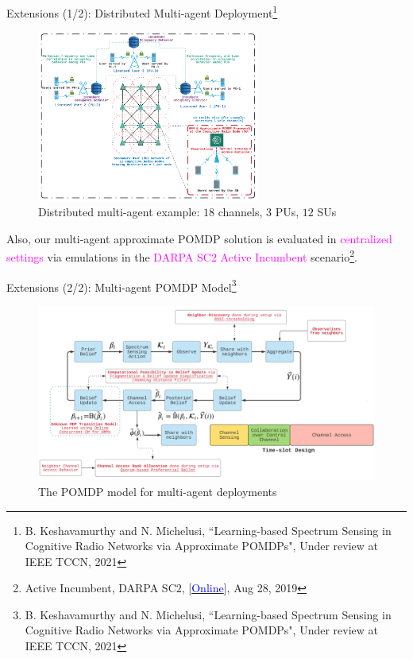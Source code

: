 \documentclass{beamer}
\begin{document}
\begin{frame}{Extensions (1/2): Distributed Multi-agent Deployment\footnote{\tiny{B. Keshavamurthy and N. Michelusi, ``Learning-based Spectrum Sensing in Cognitive Radio Networks via Approximate POMDPs", Under review at IEEE TCCN, 2021}}}
\begin{figure}
    \centering
    \includegraphics[width = 0.65\textwidth]{figs/Minerva_Multiagent_System_Model.png}
    \caption{Distributed multi-agent example: $18$ channels, $3$ PUs, $12$ SUs}
    \label{fig:5b}
\end{figure}
\vspace{-5mm}
\footnotesize{Also, our multi-agent approximate POMDP solution is evaluated in \textcolor{magenta}{centralized settings} via emulations in the \textcolor{magenta}{DARPA SC$2$ Active Incumbent} scenario\footnote{\tiny{Active Incumbent, DARPA SC$2$, [\href{https://sc2colosseum.freshdesk.com/support/solutions/articles/22000239489-active-incumbent-}{\textcolor{blue}{Online}}], Aug 28, 2019}}.}
\end{frame}
\begin{frame}{Extensions (2/2): Multi-agent POMDP Model\footnote{\tiny{B. Keshavamurthy and N. Michelusi, ``Learning-based Spectrum Sensing in Cognitive Radio Networks via Approximate POMDPs", Under review at IEEE TCCN, 2021}}}
\begin{figure}
    \centering
    \includegraphics[width = 1.0\textwidth]{figs/POMDP_MultiAgent_Model.PNG}
    \caption{The POMDP model for multi-agent deployments}
    \label{fig:5c}
\end{figure}
\end{frame}
\end{document}
